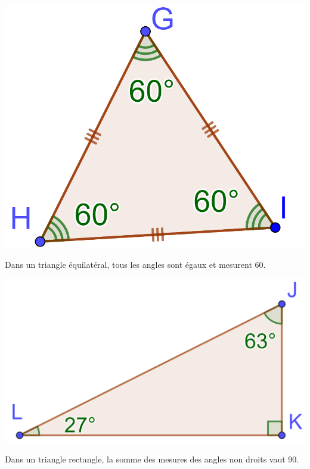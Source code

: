 \documentclass[xcolor={dvipsnames}]{beamer}
\begin{document}
\begin{frame}
	\begin{myex}
		\begin{center}
			\includegraphics[scale=0.22]{equilateral}\pause
		\end{center}
		
			Dans un triangle équilatéral, \pause tous les angles sont égaux et mesurent 60\degree.
	\end{myex}
\end{frame}

\begin{frame}
	\begin{myex}
		\begin{center}
			\includegraphics[scale=0.22]{rectangle}\pause
		\end{center}
		
		Dans un triangle rectangle, \pause la somme des mesures des angles non droits vaut 90\degree.
	\end{myex}
\end{frame}
\end{document}
